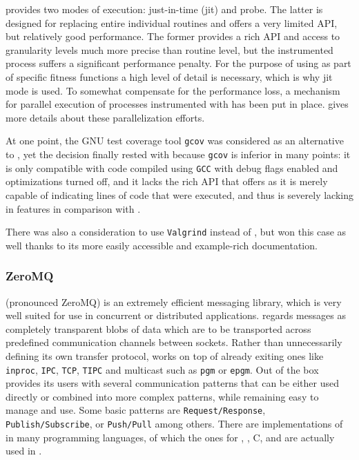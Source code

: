 \pin provides two modes of execution: just-in-time (jit) and probe. The latter is designed for replacing
entire individual routines and offers a very limited API, but relatively good performance. The former provides
a rich API and access to granularity levels much more precise than routine level, but the instrumented process
suffers a significant performance penalty. For the purpose of using \pin as part of specific fitness functions
a high level of detail is necessary, which is why jit mode is used. To somewhat compensate for the performance
loss, a mechanism for parallel execution of processes instrumented with \pin has been put in place.
 gives more details about these parallelization efforts.

At one point, the GNU test coverage tool \texttt{gcov}\cite{gcov} was considered as an alternative to 
\pin, yet the decision finally rested with \pin because \texttt{gcov} is inferior in many points: it is only
compatible with code compiled using \texttt{GCC} with debug flags enabled and optimizations turned off,
and it lacks the rich API that \pin offers as it is merely capable of indicating lines of code that were executed, and
thus is severely lacking in features in comparison with \pin.

There was also a consideration to use \texttt{Valgrind}\cite{Nethercote03valgrind:a} instead of \pin, but \pin
won this case as well thanks to its more easily accessible and example-rich documentation. 

\tocless\subsubsection{ZeroMQ}
\label{sec:zmq}
\zmq{}\cite{zmq} (pronounced {\small ZeroMQ}) is an extremely efficient messaging library, 
which is very well suited for use in concurrent or distributed applications. \zmq regards messages as 
completely transparent blobs of data which are to be transported across predefined communication channels 
between sockets. Rather than unnecessarily defining its own transfer protocol, \zmq works on top of already exiting 
ones like \texttt{inproc}, \texttt{IPC}, \texttt{TCP}, \texttt{TIPC} and multicast such as \texttt{pgm} or \texttt{epgm}.
Out of the box \zmq provides its users with several communication patterns that can be either used directly or combined 
into more complex patterns, while remaining easy to manage and use. Some basic patterns are
\texttt{Request/Response}, \texttt{Publish/Subscribe}, or \texttt{Push/Pull} among others.
There are implementations of \zmq in many programming languages, of which the ones for \java, \python, {\small C}, 
and \cpp are actually used in \xmlmate. 

